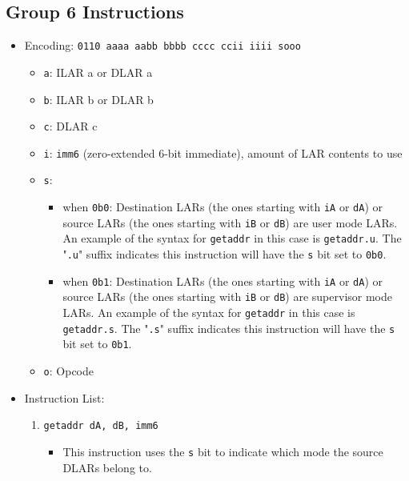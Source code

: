 \documentclass{article}
\begin{document}
	\subsection{Group 6 Instructions}
		\begin{itemize}
		\item Encoding:  \texttt{0110 aaaa aabb bbbb  cccc ccii iiii sooo}
			\begin{itemize}
			\item \texttt{a}:  ILAR a or DLAR a
			\item \texttt{b}:  ILAR b or DLAR b
			\item \texttt{c}:  DLAR c
			\item \texttt{i}:  \texttt{imm6} (zero-extended 6-bit
			immediate), amount of LAR contents to use
			\item \texttt{s}:
				\begin{itemize}
				\item when \texttt{0b0}:  Destination LARs (the ones
				starting with \texttt{iA} or \texttt{dA}) or source LARs
				(the ones starting with \texttt{iB} or \texttt{dB}) are
				user mode LARs.  An example of the syntax for
				\texttt{getaddr} in this case is \texttt{getaddr.u}.  The
				"\texttt{.u}" suffix indicates this instruction will have
				the \texttt{s} bit set to \texttt{0b0}.

				\item when \texttt{0b1}:  Destination LARs (the ones
				starting with \texttt{iA} or \texttt{dA}) or source LARs
				(the ones starting with \texttt{iB} or \texttt{dB}) are
				supervisor mode LARs.  An example of the syntax for
				\texttt{getaddr} in this case is \texttt{getaddr.s}.  The
				"\texttt{.s}" suffix indicates this instruction will have
				the \texttt{s} bit set to \texttt{0b1}.
				\end{itemize}
			\item \texttt{o}:  Opcode
			\end{itemize}

		\item Instruction List:
			\begin{enumerate}
			\item \texttt{getaddr dA, dB, imm6}
				\begin{itemize}
				\item This instruction uses the \texttt{s} bit to indicate
				which mode the source DLARs belong to.


\end{itemize}
\end{enumerate}
\end{itemize}
\end{document}
